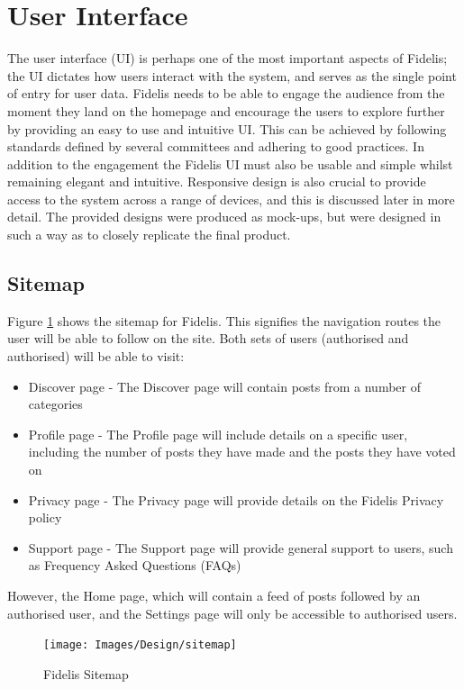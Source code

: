 \section{User Interface}
The user interface (UI) is perhaps one of the most important aspects of Fidelis; the UI dictates how users interact with the system, and serves as the single point of entry for user data. Fidelis needs to be able to engage the audience from the moment they land on the homepage and encourage the users to explore further by providing an easy to use and intuitive UI. This can be achieved by following standards defined by several committees and adhering to good practices. In addition to the engagement the Fidelis UI must also be usable and simple whilst remaining elegant and intuitive. Responsive design is also crucial to provide access to the system across a range of devices, and this is discussed later in more detail. The provided designs were produced as mock-ups, but were designed in such a way as to closely replicate the final product.

\subsection{Sitemap}
Figure \ref{fig:sitemap} shows the sitemap for Fidelis. This signifies the navigation routes the user will be able to follow on the site. Both sets of users (authorised and authorised) will be able to visit:
\begin{itemize}
\item Discover page - The Discover page will contain posts from a number of categories
\item Profile page - The Profile page will include details on a specific user, including the number of posts they have made and the posts they have voted on
\item Privacy page - The Privacy page will provide details on the Fidelis Privacy policy
\item Support page - The Support page will provide general support to users, such as Frequency Asked Questions (FAQs)
\end{itemize}

However, the Home page, which will contain a feed of posts followed by an authorised user, and the Settings page will only be accessible to authorised users.

\begin{figure}
\centering
\texttt{[image: Images/Design/sitemap]}
\caption{Fidelis Sitemap}
\label{fig:sitemap}
\end{figure}

